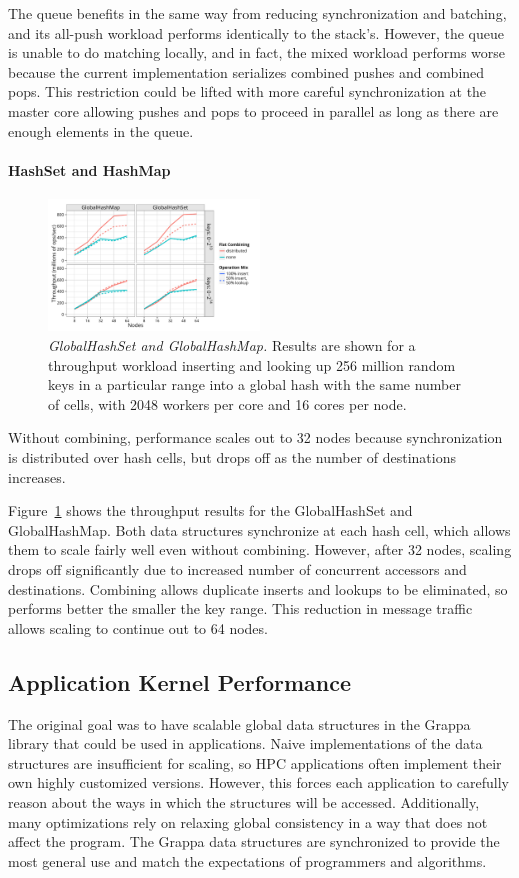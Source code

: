 The queue benefits in the same way from reducing synchronization and batching, and its all-push workload performs identically to the stack's.
However, the queue is unable to do matching locally, and in fact, the mixed workload performs worse because the current implementation serializes combined pushes and combined pops. This restriction could be lifted with more careful synchronization at the master core allowing pushes and pops to proceed in parallel as long as there are enough elements in the queue.

\paragraph{HashSet and HashMap}
\begin{figure}[t]
  \centering
  \includegraphics[width=0.5\textwidth]{data/plots/hash_perf.pdf}
  \caption{\emph{GlobalHashSet and GlobalHashMap.}
    Results are shown for a throughput workload inserting and looking up 256 million random keys in a particular range into a global hash with the same number of cells, with 2048 workers per core and 16 cores per node.
  }
  \label{fig:hash_perf}
\end{figure}

Without combining, performance scales out to 32 nodes because synchronization is distributed over hash cells, but drops off as the number of destinations increases.

Figure~\ref{fig:hash_perf} shows the throughput results for the GlobalHashSet and GlobalHashMap.
Both data structures synchronize at each hash cell, which allows them to scale fairly well even without combining. However, after 32 nodes, scaling drops off significantly due to increased number of concurrent accessors and destinations.
Combining allows duplicate inserts and lookups to be eliminated, so performs better the smaller the key range. This reduction in message traffic allows scaling to continue out to 64 nodes.

\subsection{Application Kernel Performance}
The original goal was to have scalable global data structures in the Grappa library that could be used in applications. Naive implementations of the data structures are insufficient for scaling, so HPC applications often implement their own highly customized versions. However, this forces each application to carefully reason about the ways in which the structures will be accessed. Additionally, many optimizations rely on relaxing global consistency in a way that does not affect the program. 
The Grappa data structures are synchronized to provide the most general use and match the expectations of programmers and algorithms.

